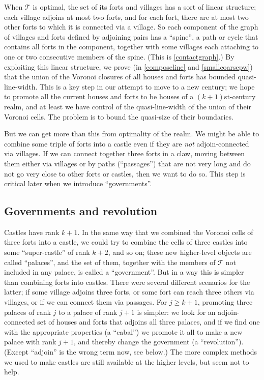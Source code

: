 \documentclass[titlepage,11pt]{article}
\newcommand{\mac}{\mathcal}
\begin{document}
	When $\mac T$ is optimal, the set of its forts and villages has a sort of linear structure; each village adjoins 
	at most two forts, and for each fort, there are at most two other forts to which it is connected via a village. So each 
	component of the
	graph of villages and forts defined by adjoining pairs has a ``spine'', a path or cycle that contains all forts in the component,
	together
	with some villages each attaching to one or two consecutive members of the spine. (This is \ref{contactgraph}.) By exploiting this linear structure,
	we prove (in \ref{composeline} and \ref{smallcoarsepw}) that the 
	union of the Voronoi closures of all houses and forts has bounded quasi-line-width. This is a key step in our attempt to move to a new century; 
	we hope to promote all the current houses and forts to be houses of a $(k+1)$st-century realm, and at least we have control of the quasi-line-width of the union of their Voronoi cells. The problem is to bound the quasi-size of their boundaries.
	
	But we can get more than this from optimality of the realm. We might be able to combine some triple of forts into a castle even if they are 
	{\em not} adjoin-connected via villages. If we can connect together three forts in a claw, moving between them either 
	via villages or
	by paths (``passages'') that are not very long and do not go very close to other forts or castles, then we want to do so. This step is critical later
	when we introduce ``governments''.
	
	\subsection{Governments and revolution}
	
	Castles have rank $k+1$. 
	In the same way that we combined the Voronoi cells of three forts into a castle, we could try to combine the cells of three castles  into some 
	``super-castle'' of rank $k+2$, and so on; these new higher-level objects are called ``palaces'', and the set of them,
	together with the members of $\mac T$ not included in any palace, is called a ``government''. 
	But in a way this is simpler than combining forts into castles. There were several different scenarios for the latter; if some village adjoins three forts, or some fort
	can reach three others via villages, or if we can connect them via passages. For $j\ge k+1$, promoting three palaces of rank 
	$j$ 
	to a palace of rank $j+1$ is simpler: we look for an adjoin-connected set of houses and forts  that adjoins all three 
	palaces, and if we find one with the appropriate properties (a ``cabal'') we promote it all to make a new palace with rank $j+1$, and thereby change the government (a 
	``revolution''). (Except ``adjoin'' is the wrong term now, see below.)
	The more complex methods we used to make castles are still available at the higher levels, but seem not to help.
	
\end{document}
